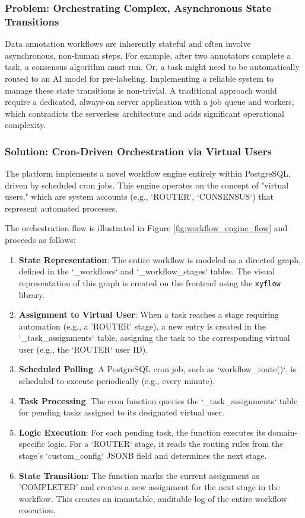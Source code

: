 \subsubsection{Problem: Orchestrating Complex, Asynchronous State Transitions}
Data annotation workflows are inherently stateful and often involve asynchronous, non-human steps. For example, after two annotators complete a task, a consensus algorithm must run. Or, a task might need to be automatically routed to an AI model for pre-labeling. Implementing a reliable system to manage these state transitions is non-trivial. A traditional approach would require a dedicated, always-on server application with a job queue and workers, which contradicts the serverless architecture and adds significant operational complexity.

\subsubsection{Solution: Cron-Driven Orchestration via Virtual Users}
The platform implements a novel workflow engine entirely within PostgreSQL, driven by scheduled cron jobs. This engine operates on the concept of "virtual users," which are system accounts (e.g., `ROUTER`, `CONSENSUS`) that represent automated processes.

The orchestration flow is illustrated in Figure \ref{fig:workflow_engine_flow} and proceeds as follows:
\begin{enumerate}
    \item \textbf{State Representation}: The entire workflow is modeled as a directed graph, defined in the `_workflows` and `_workflow_stages` tables. The visual representation of this graph is created on the frontend using the \texttt{xyflow} library.
    \item \textbf{Assignment to Virtual User}: When a task reaches a stage requiring automation (e.g., a 'ROUTER' stage), a new entry is created in the `_task_assignments` table, assigning the task to the corresponding virtual user (e.g., the `ROUTER` user ID).
    \item \textbf{Scheduled Polling}: A PostgreSQL cron job, such as `workflow_route()`, is scheduled to execute periodically (e.g., every minute).
    \item \textbf{Task Processing}: The cron function queries the `_task_assignments` table for pending tasks assigned to its designated virtual user.
    \item \textbf{Logic Execution}: For each pending task, the function executes its domain-specific logic. For a `ROUTER` stage, it reads the routing rules from the stage's `custom_config` JSONB field and determines the next stage.
    \item \textbf{State Transition}: The function marks the current assignment as 'COMPLETED' and creates a new assignment for the next stage in the workflow. This creates an immutable, auditable log of the entire workflow execution.
\end{enumerate}

